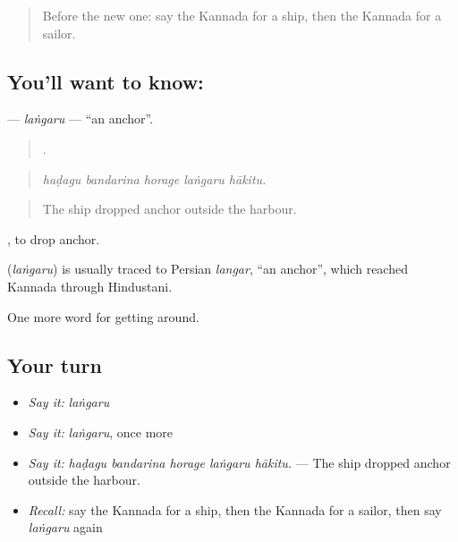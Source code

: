 \label{lesson:KA-C453-langaru}



\begin{quote}
Before the new one: say the Kannada for a ship, then the Kannada for a sailor.
\end{quote}

\subsection*{You'll want to know: }
\textbf{} — \emph{laṅgaru} — \textquotedblleft{}an anchor\textquotedblright{}.

\begin{quote}
    .
\end{quote}

\begin{quote}
\emph{haḍagu bandarina horage laṅgaru hākitu.}
\end{quote}

\begin{quote}
The ship dropped anchor outside the harbour.
\end{quote}

 , to drop anchor.

\begin{cousinweb}
\textbf{} (\emph{laṅgaru}) is usually traced to Persian \emph{langar}, \textquotedblleft{}an anchor\textquotedblright{}, which reached Kannada through Hindustani.
\end{cousinweb}

\begin{grammarlens}[title={What you've built}]
One more word for getting around.
\end{grammarlens}

\subsection*{Your turn}
\begin{itemize}
\raggedright
  \item \emph{Say it:} \emph{laṅgaru}
  \item \emph{Say it:} \emph{laṅgaru}, once more
  \item \emph{Say it:} \emph{haḍagu bandarina horage laṅgaru hākitu.} — The ship dropped anchor outside the harbour.
  \item \emph{Recall:} say the Kannada for a ship, then the Kannada for a sailor, then say \emph{laṅgaru} again
\end{itemize}

